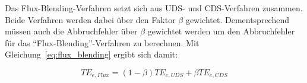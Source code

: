 Das Flux-Blending-Verfahren setzt sich aus UDS- und CDS-Verfahren zusammen. Beide
Verfahren werden dabei über den Faktor $\beta$ gewichtet. Dementsprechend müssen auch die
Abbruchfehler über $\beta$ gewichtet werden um den Abbruchfehler für das ``Flux-Blending''-Verfahren zu berechnen.
Mit Gleichung~\ref{eq:flux_blending} ergibt sich damit:

\begin{equation}
  TE_{e, Flux} = (1-\beta) TE_{e, UDS} + \beta TE_{e, CDS}
\end{equation}







\clearpage
